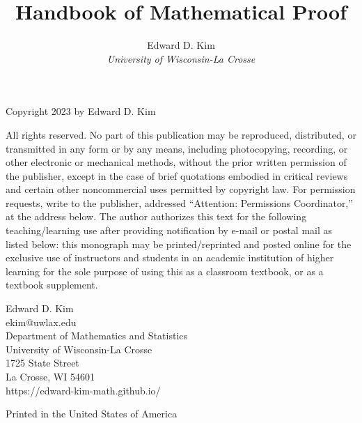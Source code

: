 \documentclass{book}
\theoremstyle{ekimcustom}
\begin{document}
\frontmatter

\title{Handbook of Mathematical Proof}
\author{Edward D. Kim\\\sl{University of Wisconsin-La Crosse}}
\date{}

\maketitle


\noindent
Copyright \textcopyright{} 2023 by Edward D. Kim

\vskip24pt\noindent
All rights reserved. No part of this publication may be reproduced, distributed, or transmitted in any form or by any means, including photocopying, recording, or other electronic or mechanical methods, without the prior written permission of the publisher, except in the case of brief quotations embodied in critical reviews and certain other noncommercial uses permitted by copyright law. For permission requests, write to the publisher, addressed ``Attention: Permissions Coordinator,'' at the address below. The author authorizes this text for the following teaching/learning use after providing notification by e-mail or postal mail as listed below: this monograph may be printed/reprinted and posted online for the exclusive use of instructors and students in an academic institution of higher learning for the sole purpose of using this as a classroom textbook, or as a textbook supplement.

\vfill

\vskip24pt\noindent
Edward D. Kim\\
ekim@uwlax.edu\\
Department of Mathematics and Statistics\\
University of Wisconsin-La Crosse\\
1725 State Street\\
La Crosse, WI 54601\\
https://edward-kim-math.github.io/


\vskip24pt\noindent
Printed in the United States of America
\end{document}
